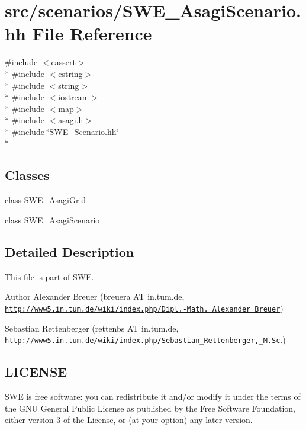 \hypertarget{SWE__AsagiScenario_8hh}{\section{src/scenarios/\-S\-W\-E\-\_\-\-Asagi\-Scenario.hh File Reference}
\label{SWE__AsagiScenario_8hh}
}
{\ttfamily \#include $<$cassert$>$}\\*
{\ttfamily \#include $<$cstring$>$}\\*
{\ttfamily \#include $<$string$>$}\\*
{\ttfamily \#include $<$iostream$>$}\\*
{\ttfamily \#include $<$map$>$}\\*
{\ttfamily \#include $<$asagi.\-h$>$}\\*
{\ttfamily \#include \char`\"{}S\-W\-E\-\_\-\-Scenario.\-hh\char`\"{}}\\*
\subsection*{Classes}
\begin{DoxyCompactItemize}
\item 
class \hyperlink{classSWE__AsagiGrid}{S\-W\-E\-\_\-\-Asagi\-Grid}
\item 
class \hyperlink{classSWE__AsagiScenario}{S\-W\-E\-\_\-\-Asagi\-Scenario}
\end{DoxyCompactItemize}


\subsection{Detailed Description}
This file is part of S\-W\-E.

\begin{DoxyAuthor}{Author}
Alexander Breuer (breuera A\-T in.\-tum.\-de, \href{http://www5.in.tum.de/wiki/index.php/Dipl.-Math._Alexander_Breuer}{\tt http\-://www5.\-in.\-tum.\-de/wiki/index.\-php/\-Dipl.-\/\-Math.\-\_\-\-Alexander\-\_\-\-Breuer}) 

Sebastian Rettenberger (rettenbs A\-T in.\-tum.\-de, \href{http://www5.in.tum.de/wiki/index.php/Sebastian_Rettenberger,_M.Sc}{\tt http\-://www5.\-in.\-tum.\-de/wiki/index.\-php/\-Sebastian\-\_\-\-Rettenberger,\-\_\-\-M.\-Sc}.)
\end{DoxyAuthor}
\hypertarget{Writer_8hh_LICENSE}{}\subsection{L\-I\-C\-E\-N\-S\-E}\label{Writer_8hh_LICENSE}
S\-W\-E is free software\-: you can redistribute it and/or modify it under the terms of the G\-N\-U General Public License as published by the Free Software Foundation, either version 3 of the License, or (at your option) any later version.

